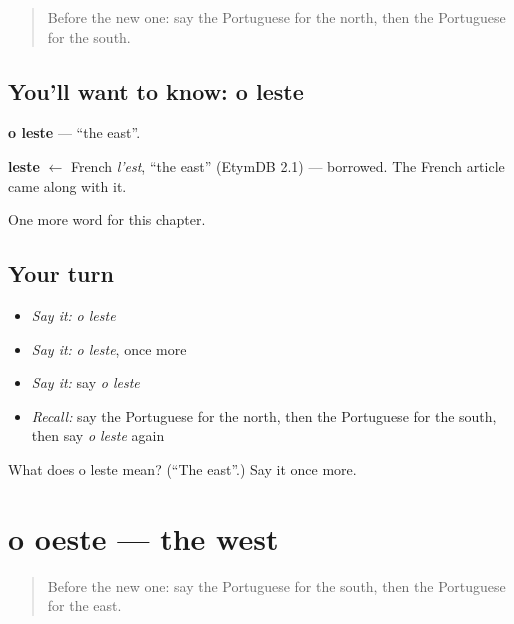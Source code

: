 \label{lesson:PT-C88-leste}



\begin{quote}
Before the new one: say the Portuguese for the north, then the Portuguese for the south.
\end{quote}

\subsection*{You'll want to know: o leste}
\textbf{o leste} — \textquotedblleft{}the east\textquotedblright{}.

\begin{cousinweb}
\textbf{leste} $\leftarrow$ French \emph{l'est}, \textquotedblleft{}the east\textquotedblright{} (EtymDB 2.1) — borrowed. The French article came along with it.
\end{cousinweb}

\begin{grammarlens}[title={What you've built}]
One more word for this chapter.
\end{grammarlens}

\subsection*{Your turn}
\begin{itemize}
\raggedright
  \item \emph{Say it:} \emph{o leste}
  \item \emph{Say it:} \emph{o leste}, once more
  \item \emph{Say it:} say \emph{o leste}
  \item \emph{Recall:} say the Portuguese for the north, then the Portuguese for the south, then say \emph{o leste} again
\end{itemize}

\begin{tcolorbox}[breakable,colback=teal!4,colframe=teal!35!black,title={Before you move on}]
What does o leste mean? (\textquotedblleft{}The east\textquotedblright{}.) Say it once more.
\end{tcolorbox}
\section[o oeste]{o oeste — the west}

\label{lesson:PT-C88-oeste}



\begin{quote}
Before the new one: say the Portuguese for the south, then the Portuguese for the east.
\end{quote}

